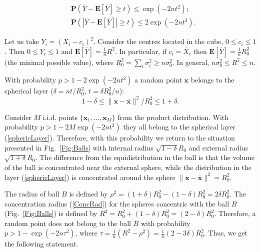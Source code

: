\documentclass[final,5p,times,twocolumn]{elsarticle}
\begin{document}
\begin{equation}
\begin{split}
&\mathbf{P} \left(\overline Y - \mathbf{E}\left [\overline Y \right] \geq t \right) \leq \exp \left(-2n t^2 \right); \\
&\mathbf{P} \left(\left |\overline Y - \mathbf{E}\left [\overline Y \right] \right | \geq t \right) \leq 2\exp \left(-2nt^2 \right).
\end{split}
\end{equation}

 Let us take $Y_i=(X_i-c_i)^2$. Consider the centres located in the cube, $0\leq c_i \leq 1$. Then $0\leq Y_i \leq 1$ and $\mathbf{E}\left [\overline Y \right]=\frac{1}{n}R^2$. In particular, if $c_i=\overline{X}_i$ then $\mathbf{E}\left [\overline Y \right]=\frac{1}{n}R_0^2$ (the minimal possible value), where $R_0^2=\sum_i \sigma_i^2\geq n\sigma_0^2$. In general, $n\sigma_0^2\leq R^2 \leq n$.

 With probability $p>1- 2\exp \left(-2nt^2 \right)$ a random point $\boldsymbol{x}$ belongs to the spherical layer ($\delta={nt}/{R_0^2}$, $t=\delta R_0^2/n$):
 \begin{equation}\label{sphericLayer}
1-\delta \leq {\|\boldsymbol{x}-\overline{\boldsymbol{x}}\|^2}/{R_0^2}\leq 1+\delta.
\end{equation}

Consider $M$ i.i.d. points $\{\boldsymbol{x}_1, \ldots , \boldsymbol{x}_M\}$ from the product distribution. With probability $p>1- 2M\exp \left(-2nt^2 \right)$ they all belong to the spherical layer (\ref{sphericLayer}). Therefore, with this probability we return to the situation presented in Fig.~\ref{Fig:Balls}  with internal radius $\sqrt{1-\delta}R_0$ and external radius $\sqrt{1+\delta}R_0$. The difference from the equidistribution in the ball is that the volume of the ball is concentrated near the external sphere, while the distribution in the layer (\ref{sphericLayer}) is concentrated around the sphere $\|\boldsymbol{x}-\overline{\boldsymbol{x}}\|^2=R_0^2$.

The radius of ball $B$ is defined by $\rho^2=(1+\delta)R_0^2-(1-\delta)R_0^2=2\delta R_0^2$.
The concentration radius (\ref{ConcRad}) for the spheres concentric with the ball $B$ (Fig.~\ref{Fig:Balls}) is defined by $R^2=R_0^2+(1-\delta)R_0^2=(2-\delta)R_0^2$.
Therefore,  a random point does not belong to the ball $B$ with probability $p>1- \exp \left(-2n\tau^2 \right)$,  where
$\tau=\frac{1}{n}(R^2-\rho^2)=\frac{1}{n}(2-3 \delta)R^2_0$.
 Thus,  we get the following statement.
\end{document}
